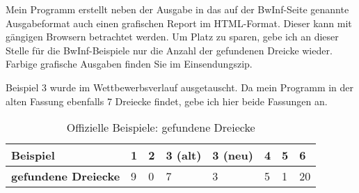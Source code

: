 Mein Programm erstellt neben der Ausgabe in das auf der BwInf-Seite genannte
Ausgabeformat auch einen grafischen Report im HTML-Format.
Dieser kann mit gängigen Browsern betrachtet werden.
Um Platz zu sparen, gebe ich an dieser Stelle für die BwInf-Beispiele nur die Anzahl
der gefundenen Dreicke wieder. Farbige grafische Ausgaben finden Sie im Einsendungszip.

Beispiel 3 wurde im Wettbewerbsverlauf ausgetauscht. Da mein Programm in der alten
Fassung ebenfalls 7 Dreiecke findet, gebe ich hier beide Fassungen an.

\begin{table}[h]
    \centering
    \begin{tabular}{l|lllllll}
        \textbf{Beispiel}           & 1 & 2 & 3 (alt) & 3 (neu) & 4 & 5 & 6 \\ \hline
        \textbf{gefundene Dreiecke} & 9 & 0 & 7       & 3 & 5 & 1 & 20
    \end{tabular}
    \caption{Offizielle Beispiele: gefundene Dreiecke}
    \label{tab:bwinfbeispiele}
\end{table}
